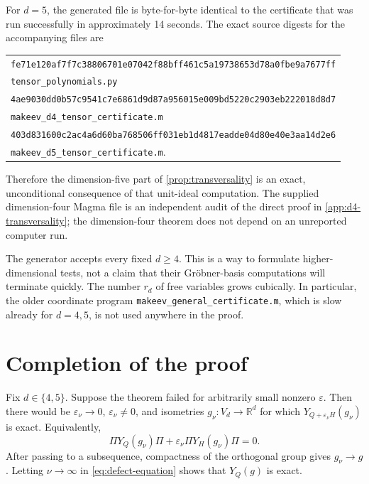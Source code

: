 \documentclass[11pt,reqno]{amsart}
\theoremstyle{remark}
\newcommand{\R}{\mathbb R}
\newcommand{\eps}{\varepsilon}
\begin{document}
For $d=5$, the generated file is byte-for-byte identical to the certificate
that was run successfully in approximately 14 seconds.  The exact source
digests for the accompanying files are
\begin{center}
\begin{tabular}{@{}l@{}}
\texttt{fe71e120af7f7c38806701e07042f88bff461c5a19738653d78a0fbe9a7677ff}\\
\quad\texttt{tensor\_polynomials.py}\\[2pt]
\texttt{4ae9030dd0b57c9541c7e6861d9d87a956015e009bd5220c2903eb222018d8d7}\\
\quad\texttt{makeev\_d4\_tensor\_certificate.m}\\[2pt]
\texttt{403d831600c2ac4a6d60ba768506ff031eb1d4817eadde04d80e40e3aa14d2e6}\\
\quad\texttt{makeev\_d5\_tensor\_certificate.m}.
\end{tabular}
\end{center}
Therefore the dimension-five part of
\cref{prop:transversality} is an exact, unconditional consequence of that
unit-ideal computation.  The supplied dimension-four Magma file is an
independent audit of the direct proof in \cref{app:d4-transversality}; the
dimension-four theorem does not depend on an unreported computer run.

The generator accepts every fixed $d\ge4$.  This is a way to formulate
higher-dimensional tests, not a claim that their Gr\"obner-basis computations
will terminate quickly.  The number $r_d$ of free variables grows cubically.
In particular, the older coordinate program
\texttt{makeev\_general\_certificate.m}, which is slow already for $d=4,5$,
is not used anywhere in the proof.

\section{Completion of the proof}
\label{sec:completion}

Fix $d\in\{4,5\}$.  Suppose the theorem failed for arbitrarily small
nonzero $\eps$.  Then there would be $\eps_\nu\to0$, $\eps_\nu\ne0$, and
isometries $g_\nu:V_d\to\R^d$ for which $Y_{Q+\eps_\nu H}(g_\nu)$ is exact.
Equivalently,
\begin{equation}\label{eq:defect-equation}
 \Pi Y_Q(g_\nu)\Pi
 +\eps_\nu\Pi Y_H(g_\nu)\Pi=0.
\end{equation}
After passing to a subsequence, compactness of the orthogonal group gives
$g_\nu\to g$.  Letting $\nu\to\infty$ in
\eqref{eq:defect-equation} shows that $Y_Q(g)$ is exact.
\end{document}

